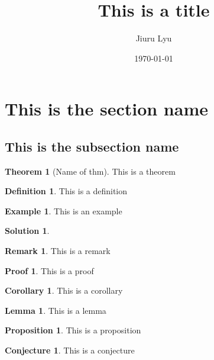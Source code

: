 \documentclass[12pt, a4paper]{article}
\title{\textbf{This is a title}}
\author{Jiuru Lyu}
\date{\today}
\theoremstyle{definition}
\newtheorem{thm}{Theorem}[subsection]
\newtheorem{df}{Definition}[subsection]
\newtheorem{eg}{Example}[subsection]
\newtheorem*{sol}{\indent\bf Solution}
\newtheorem*{rmk}{\indent Remark}
\newtheorem*{prf}{\indent Proof}
\newtheorem{cor}{Corollary}[subsection]
\newtheorem{lem}{Lemma}[subsection]
\newtheorem{prop}{Proposition}[subsection]
\newtheorem{conj}{Conjecture}[subsection]
\begin{document}
\section{This is the section name}
\subsection{This is the subsection name}

\begin{thm}[Name of thm]
	This is a theorem
\end{thm}

\begin{df}
	This is a definition
\end{df}

\begin{eg}
	This is an example
\end{eg}
\begin{sol}
	
\end{sol}


\begin{rmk}
	This is a remark
\end{rmk}

\begin{prf}
	This is a proof
\end{prf}

\begin{cor}
	This is a corollary
\end{cor}

\begin{lem}
	This is a lemma
\end{lem}

\begin{prop}
	This is a proposition
\end{prop}

\begin{conj}
	This is a conjecture
\end{conj}
	
\end{document}
